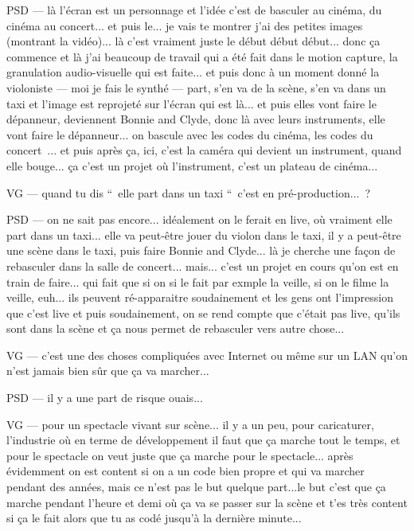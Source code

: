 PSD — là l'écran est un personnage et l'idée c'est de basculer au cinéma, du cinéma au concert... et puis le... je vais te montrer j'ai des petites images (montrant la vidéo)... là c'est vraiment juste le début début début... donc ça commence et là j'ai beaucoup de travail qui a été fait dans le motion capture, la granulation audio-visuelle qui est faite... et puis donc à un moment donné la violoniste — moi je fais le synthé — part, s'en va de la scène, s'en va dans un taxi et l'image est reprojeté sur l'écran qui est là... et puis elles vont faire le dépanneur, deviennent Bonnie and Clyde, donc là avec leurs instruments, elle vont faire le dépanneur... on bascule avec les codes du cinéma, les codes du concert ... et puis après ça, ici, c'est la caméra qui devient un instrument, quand elle bouge... ça c'est un projet où l'instrument, c'est un plateau de cinéma...

VG — quand tu dis “ elle part dans un taxi “ c'est en pré-production... ?

PSD — on ne sait pas encore... idéalement on le ferait en live, où vraiment elle part dans un taxi... elle va peut-être jouer du violon dans le taxi, il y a peut-être une scène dans le taxi, puis faire Bonnie and Clyde... là je cherche une façon de rebasculer dans la salle de concert... mais... c'est un projet en cours qu'on est en train de faire... qui fait que si on si le fait par exmple la veille, si on le filme la veille, euh... ils peuvent ré-apparaitre soudainement et les gens ont l'impression que c'est live et puis soudainement, on se rend compte que c'était pas live, qu'ils sont dans la scène et ça nous permet de rebasculer vers autre chose...

VG — c'est une des choses compliquées avec Internet ou même sur un LAN qu'on n'est jamais bien sûr que ça va marcher...

PSD — il y a une part de risque ouais... 

VG —  pour un spectacle vivant sur scène... il y a un peu, pour caricaturer, l'industrie où en terme de développement il faut que ça marche tout le temps, et pour le spectacle on veut juste que ça marche pour le spectacle... après évidemment on est content si on a un code bien propre et qui va marcher pendant des années, mais ce n'est pas le but quelque part...le but c'est que ça marche pendant l'heure et demi où ça va se passer sur la scène et t'es très content si ça le fait alors que tu as codé jusqu'à la dernière minute...

